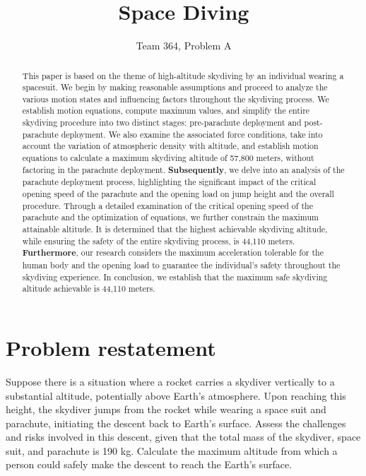 \documentclass[12pt]{article}
\title{Space Diving}
\author{Team 364, Problem A}
\begin{document}
\maketitle 
\thispagestyle{fancy}

\begin{abstract}

This paper is based on the theme of high-altitude skydiving by an individual wearing a spacesuit. We begin by making reasonable assumptions 
and proceed to analyze the various motion states and influencing factors throughout the skydiving process. We establish motion equations, 
compute maximum values, and simplify the entire skydiving procedure into two distinct stages: pre-parachute deployment and post-parachute 
deployment. We also examine the associated force conditions, take into account the variation of atmospheric density with altitude, and 
establish motion equations to calculate a maximum skydiving altitude of 57,800 meters, without factoring in the parachute deployment.
\textbf{Subsequently}, we delve into an analysis of the parachute deployment process, highlighting the significant impact of the critical 
opening speed of the parachute and the opening load on jump height and the overall procedure. Through a detailed examination of the critical
opening speed of the parachute and the optimization of equations, we further constrain the maximum attainable altitude. It is 
determined that the highest achievable skydiving altitude, while ensuring the safety of the entire skydiving process, is 44,110 meters.
\textbf{Furthermore}, our research considers the maximum acceleration tolerable for the human body and the opening load 
to guarantee the individual's safety throughout the skydiving experience. In conclusion, we establish that the maximum safe 
skydiving altitude achievable is 44,110 meters.

\end{abstract}

\newpage 
\tableofcontents

\newpage

\section{Problem restatement}

Suppose there is a situation where a rocket carries a skydiver vertically to a substantial altitude, 
potentially above Earth's atmosphere. Upon reaching this height, the skydiver jumps from the rocket while wearing a space 
suit and parachute, initiating the descent back to Earth's surface. Assess the challenges and risks 
involved in this descent, given that the total mass of the skydiver, space suit, and parachute is 190 kg. Calculate the 
maximum altitude from which a person could safely make the descent to reach the Earth's surface.
\end{document}
